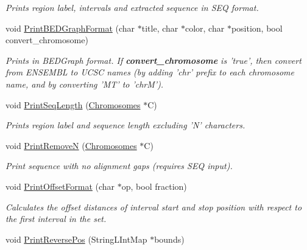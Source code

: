 \begin{CompactItemize}
\begin{CompactList}\small\item\em Prints region label, intervals and extracted sequence in SEQ format. \item\end{CompactList}\item 
\hypertarget{classGenomicRegionSet_de00553eb76b71f68e540739bdc776f4}{
void \hyperlink{classGenomicRegionSet_de00553eb76b71f68e540739bdc776f4}{PrintBEDGraphFormat} (char $\ast$title, char $\ast$color, char $\ast$position, bool convert\_\-chromosome)}
\label{classGenomicRegionSet_de00553eb76b71f68e540739bdc776f4}

\begin{CompactList}\small\item\em Prints in BEDGraph format. If {\bf convert\_\-chromosome} is 'true', then convert from ENSEMBL to UCSC names (by adding 'chr' prefix to each chromosome name, and by converting 'MT' to 'chrM'). \item\end{CompactList}\item 
\hypertarget{classGenomicRegionSet_3da972129b9b69577bbe0bb9837bbea3}{
void \hyperlink{classGenomicRegionSet_3da972129b9b69577bbe0bb9837bbea3}{PrintSeqLength} (\hyperlink{classChromosomes}{Chromosomes} $\ast$C)}
\label{classGenomicRegionSet_3da972129b9b69577bbe0bb9837bbea3}

\begin{CompactList}\small\item\em Prints region label and sequence length excluding 'N' characters. \item\end{CompactList}\item 
void \hyperlink{classGenomicRegionSet_6dc7150acdd7a0614f8a8497da687d0e}{PrintRemoveN} (\hyperlink{classChromosomes}{Chromosomes} $\ast$C)
\begin{CompactList}\small\item\em Print sequence with no alignment gaps (requires SEQ input). \item\end{CompactList}\item 
void \hyperlink{classGenomicRegionSet_e27a5c9f17f08afae277603e33d4fb91}{PrintOffsetFormat} (char $\ast$op, bool fraction)
\begin{CompactList}\small\item\em Calculates the offset distances of interval start and stop position with respect to the first interval in the set. \item\end{CompactList}\item 
\hypertarget{classGenomicRegionSet_c8de83151ba0cc30ca1b72e83ecea82f}{
void \hyperlink{classGenomicRegionSet_c8de83151ba0cc30ca1b72e83ecea82f}{PrintReversePos} (StringLIntMap $\ast$bounds)}
\label{classGenomicRegionSet_c8de83151ba0cc30ca1b72e83ecea82f}


\end{CompactItemize}
